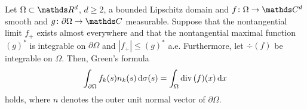 \begin{prop}
  \label{prop:approximationArgument}
  Let $\Omega \subset \R^d$, $d \geq 2$, a bounded Lipschitz domain and $f \colon \Omega \to \C^d$ smooth and $g \colon \partial\Omega \to \C$ measurable.
  Suppose that the nontangential limit $f_+$ exists almost everywhere and that the nontangential maximal function $(g)^*$ is integrable on $\partial\Omega$ and $|f_+| \leq (g)^*$ a.e.
  Furthermore, let $\div(f)$ be integrable on $\Omega$.
  Then, Green's formula
  \begin{align}
    \int_{\partial\Omega} f_k(s) n_k(s) \, {\operatorname{d}\!{\sigma}}(s) = \int_\Omega \mathrm{div\,} (f)(x) \, {\operatorname{d}\!{x}}
  \end{align}
  holds, where $n$ denotes the outer unit normal vector of $\partial\Omega$.
\end{prop}

